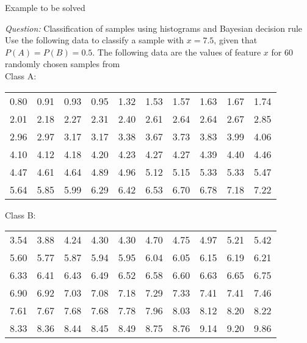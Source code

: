 \begin{frame}{Example to be solved}
\begin{footnotesize}
\textit{\color{mycolor1}Question:} Classification of samples using histograms and Bayesian decision rule\\
Use the following data to classify a sample with $x=7.5$, given that $P(A)=P(B)=0.5$. The following data are the values of feature $x$ for 60 randomly chosen samples from \\
Class A:
\begin{table}
\begin{scriptsize}
\begin{tabular}{cccccccccc}
0.80& 0.91& 0.93& 0.95& 1.32& 1.53& 1.57& 1.63& 1.67& 1.74\\
     2.01& 2.18& 2.27& 2.31& 2.40& 2.61& 2.64& 2.64& 2.67& 2.85\\
     2.96& 2.97& 3.17& 3.17& 3.38& 3.67& 3.73& 3.83& 3.99& 4.06\\
     4.10& 4.12& 4.18& 4.20& 4.23& 4.27& 4.27& 4.39& 4.40& 4.46\\
     4.47& 4.61& 4.64& 4.89& 4.96& 5.12& 5.15& 5.33& 5.33& 5.47\\
     5.64& 5.85& 5.99& 6.29& 6.42& 6.53& 6.70& 6.78& 7.18& 7.22\\
\end{tabular}
\end{scriptsize}
\end{table}

Class B:
\begin{table}
\begin{scriptsize}
\begin{tabular}{cccccccccc}
3.54& 3.88& 4.24& 4.30& 4.30& 4.70& 4.75& 4.97& 5.21& 5.42\\
     5.60& 5.77& 5.87& 5.94& 5.95& 6.04& 6.05& 6.15& 6.19& 6.21\\
     6.33& 6.41& 6.43& 6.49& 6.52& 6.58& 6.60& 6.63& 6.65& 6.75\\
     6.90& 6.92& 7.03& 7.08& 7.18& 7.29& 7.33& 7.41& 7.41& 7.46\\
     7.61& 7.67& 7.68& 7.68& 7.78& 7.96& 8.03& 8.12& 8.20& 8.22\\
     8.33& 8.36& 8.44& 8.45& 8.49& 8.75& 8.76& 9.14& 9.20& 9.86
\end{tabular}
\end{scriptsize}
\end{table}
\end{footnotesize}
\end{frame}

